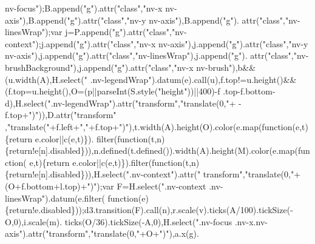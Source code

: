 \begin{DoxyCode}
{{      nv-focus"});B.append(\textcolor{stringliteral}{"g"}).attr(\textcolor{stringliteral}{"class"},\textcolor{stringliteral}{"nv-x nv-axis"}),B.append(\textcolor{stringliteral}{"g"}).attr(\textcolor{stringliteral}{"class"},\textcolor{stringliteral}{"nv-y nv-axis"}),B.append(\textcolor{stringliteral}{"g"}).
      attr(\textcolor{stringliteral}{"class"},\textcolor{stringliteral}{"nv-linesWrap"});var j=P.append(\textcolor{stringliteral}{"g"}).attr(\textcolor{stringliteral}{"class"},\textcolor{stringliteral}{"nv-context"});j.append(\textcolor{stringliteral}{"g"}).attr(\textcolor{stringliteral}{"class"},\textcolor{stringliteral}{"nv-x
       nv-axis"}),j.append(\textcolor{stringliteral}{"g"}).attr(\textcolor{stringliteral}{"class"},\textcolor{stringliteral}{"nv-y nv-axis"}),j.append(\textcolor{stringliteral}{"g"}).attr(\textcolor{stringliteral}{"class"},\textcolor{stringliteral}{"nv-linesWrap"}),j.append(\textcolor{stringliteral}{"g"}).
      attr(\textcolor{stringliteral}{"class"},\textcolor{stringliteral}{"nv-brushBackground"}),j.append(\textcolor{stringliteral}{"g"}).attr(\textcolor{stringliteral}{"class"},\textcolor{stringliteral}{"nv-x nv-brush"}),b&&(u.width(A),H.select(\textcolor{stringliteral}{"
      .nv-legendWrap"}).datum(e).call(u),f.top!=u.height()&&(f.top=u.height(),O=(p||parseInt(S.style(\textcolor{stringliteral}{"height"}))||400)-f
      .top-f.bottom-d),H.select(\textcolor{stringliteral}{".nv-legendWrap"}).attr(\textcolor{stringliteral}{"transform"},\textcolor{stringliteral}{"translate(0,"}+ -f.top+\textcolor{stringliteral}{")"})),D.attr(\textcolor{stringliteral}{"transform"}
      ,\textcolor{stringliteral}{"translate("}+f.left+\textcolor{stringliteral}{","}+f.top+\textcolor{stringliteral}{")"}),t.width(A).height(O).color(e.map(\textcolor{keyword}{function}(e,t)\{return e.color||c(e,t)\}).
      filter(\textcolor{keyword}{function}(t,n)\{\textcolor{keywordflow}{return}!e[n].disabled\})),n.defined(t.defined()).width(A).height(M).color(e.map(\textcolor{keyword}{function}(
      e,t)\{return e.color||c(e,t)\}).filter(\textcolor{keyword}{function}(t,n)\{\textcolor{keywordflow}{return}!e[n].disabled\})),H.select(\textcolor{stringliteral}{".nv-context"}).attr(\textcolor{stringliteral}{"
      transform"},\textcolor{stringliteral}{"translate(0,"}+(O+f.bottom+l.top)+\textcolor{stringliteral}{")"});var F=H.select(\textcolor{stringliteral}{".nv-context .nv-linesWrap"}).datum(e.filter(\textcolor{keyword}{
      function}(e)\{return!e.disabled\}));d3.transition(F).call(n),r.scale(v).ticks(A/100).tickSize(-O,0),i.scale(m).
      ticks(O/36).tickSize(-A,0),H.select(\textcolor{stringliteral}{".nv-focus .nv-x.nv-axis"}).attr(\textcolor{stringliteral}{"transform"},\textcolor{stringliteral}{"translate(0,"}+O+\textcolor{stringliteral}{")"}),a.x(g).
}
\end{DoxyCode}
